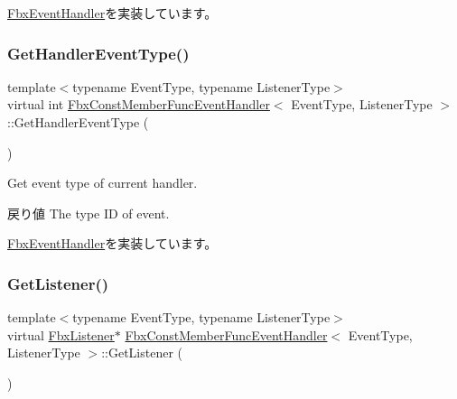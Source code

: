 \hyperlink{class_fbx_event_handler_a46357ba45116a30c8f53c3e5fe9ba2fb}{Fbx\+Event\+Handler}を実装しています。

\mbox{\label{class_fbx_const_member_func_event_handler_ac88157f51fa72cba959f31dfbcdee4a5}} 
\subsubsection{\texorpdfstring{Get\+Handler\+Event\+Type()}{GetHandlerEventType()}}
{\footnotesize\ttfamily template$<$typename Event\+Type, typename Listener\+Type$>$ \\
virtual int \hyperlink{class_fbx_const_member_func_event_handler}{Fbx\+Const\+Member\+Func\+Event\+Handler}$<$ Event\+Type, Listener\+Type $>$\+::Get\+Handler\+Event\+Type (\begin{DoxyParamCaption}{ }\end{DoxyParamCaption})\hspace{0.3cm}{\ttfamily [virtual]}}

Get event type of current handler. \begin{DoxyReturn}{戻り値}
The type ID of event. 
\end{DoxyReturn}


\hyperlink{class_fbx_event_handler_a0b42d2b93e63d866975f468a481c9f3c}{Fbx\+Event\+Handler}を実装しています。

\mbox{\label{class_fbx_const_member_func_event_handler_a9e370edd4a746ef5098d39a4f9c3d63c}} 
\subsubsection{\texorpdfstring{Get\+Listener()}{GetListener()}}
{\footnotesize\ttfamily template$<$typename Event\+Type, typename Listener\+Type$>$ \\
virtual \hyperlink{class_fbx_listener}{Fbx\+Listener}$\ast$ \hyperlink{class_fbx_const_member_func_event_handler}{Fbx\+Const\+Member\+Func\+Event\+Handler}$<$ Event\+Type, Listener\+Type $>$\+::Get\+Listener (\begin{DoxyParamCaption}{ }\end{DoxyParamCaption})\hspace{0.3cm}{\ttfamily [virtual]}}

